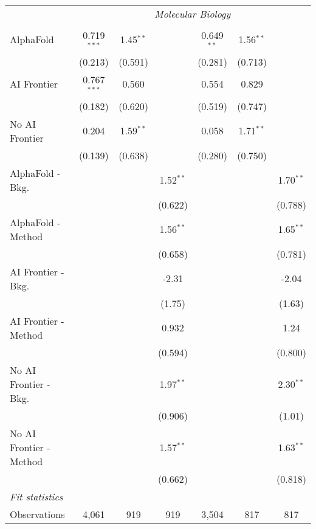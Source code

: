 \begin{tabular}{lcccccc}
 & \multicolumn{6}{c}{\textit{Molecular Biology}} \\ \\
   AlphaFold               & 0.719$^{***}$ & 1.45$^{**}$ &             & 0.649$^{**}$ & 1.56$^{**}$ &   \\   
                           & (0.213)       & (0.591)     &             & (0.281)      & (0.713)     &   \\   
   AI Frontier             & 0.767$^{***}$ & 0.560       &             & 0.554        & 0.829       &   \\   
                           & (0.182)       & (0.620)     &             & (0.519)      & (0.747)     &   \\   
   No AI Frontier          & 0.204         & 1.59$^{**}$ &             & 0.058        & 1.71$^{**}$ &   \\   
                           & (0.139)       & (0.638)     &             & (0.280)      & (0.750)     &   \\   
   AlphaFold - Bkg.        &               &             & 1.52$^{**}$ &              &             & 1.70$^{**}$\\   
                           &               &             & (0.622)     &              &             & (0.788)\\   
   AlphaFold - Method      &               &             & 1.56$^{**}$ &              &             & 1.65$^{**}$\\   
                           &               &             & (0.658)     &              &             & (0.781)\\   
   AI Frontier - Bkg.      &               &             & -2.31       &              &             & -2.04\\   
                           &               &             & (1.75)      &              &             & (1.63)\\   
   AI Frontier - Method    &               &             & 0.932       &              &             & 1.24\\   
                           &               &             & (0.594)     &              &             & (0.800)\\   
   No AI Frontier - Bkg.   &               &             & 1.97$^{**}$ &              &             & 2.30$^{**}$\\   
                           &               &             & (0.906)     &              &             & (1.01)\\   
   No AI Frontier - Method &               &             & 1.57$^{**}$ &              &             & 1.63$^{**}$\\   
                           &               &             & (0.662)     &              &             & (0.818)\\   
   \midrule
   \emph{Fit statistics}\\
   Observations            & 4,061         & 919         & 919         & 3,504        & 817         & 817\\  
   

\end{tabular}
